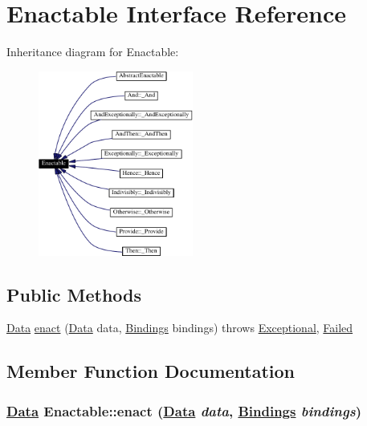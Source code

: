 \hypertarget{interfaceEnactable}{
\section{Enactable  Interface Reference}
\label{interfaceEnactable}
}
Inheritance diagram for Enactable:\begin{figure}[H]
\begin{center}
\leavevmode
\includegraphics[width=144pt]{interfaceEnactable__inherit__graph}
\end{center}
\end{figure}
\subsection*{Public Methods}
\begin{CompactItemize}
\item 
\hyperlink{interfaceData}{Data} \hyperlink{interfaceEnactable_a0}{enact} (\hyperlink{interfaceData}{Data} data, \hyperlink{interfaceBindings}{Bindings} bindings) throws \hyperlink{classExceptional}{Exceptional}, \hyperlink{classFailed}{Failed}
\end{CompactItemize}


\subsection{Member Function Documentation}
\hypertarget{interfaceEnactable_a0}{
\subsubsection[enact]{\setlength{\rightskip}{0pt plus 5cm}\hyperlink{interfaceData}{Data} Enactable::enact (\hyperlink{interfaceData}{Data} {\em data}, \hyperlink{interfaceBindings}{Bindings} {\em bindings})}}
\label{interfaceEnactable_a0}





